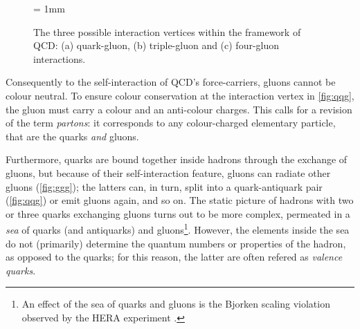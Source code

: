 \begin{figure}[H]
\begin{center}
\unitlength = 1mm
\end{center}
\caption{The three possible interaction vertices within the framework of QCD: (a) quark-gluon, (b) triple-gluon and (c) four-gluon interactions.}
\label{fig:FeynmanDiagQCD}
\end{figure}

Consequently to the self-interaction of QCD's force-carriers, gluons cannot be colour neutral. To ensure colour conservation at the interaction vertex in \fig\ref{fig:qqg}, the gluon must carry a colour and an anti-colour charges. This calls for a revision of the term \textit{partons}: it corresponds to any colour-charged elementary particle, that are the quarks \textit{and} gluons.

Furthermore, quarks are bound together inside hadrons through the exchange of gluons, but because of their self-interaction feature, gluons can radiate other gluons (\fig\ref{fig:ggg}); the latters can, in turn, split into a quark-antiquark pair (\fig\ref{fig:qqg}) or emit gluons again, and so on. The static picture of hadrons  with two or three quarks exchanging gluons turns out to be more complex, permeated in a \textit{sea} of quarks (and antiquarks) and gluons\footnote{An effect of the sea of quarks and gluons is the Bjorken scaling violation observed by the HERA experiment \cite{braibantParticlesFundamentalInteractions2012}\cite{thomsonModernParticlePhysics2013}.}. However, the elements inside the sea do not (primarily) determine the quantum numbers or properties of the hadron, as opposed to the  quarks; for this reason, the latter are often refered as \textit{valence quarks}.

